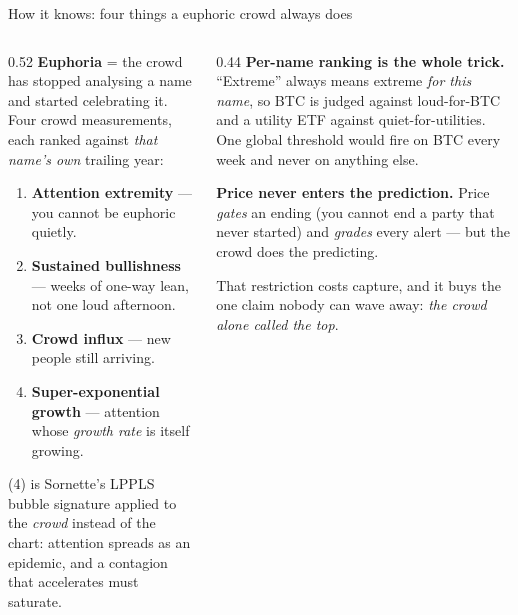\documentclass[aspectratio=169,11pt]{beamer}
\begin{document}
\begin{frame}{How it knows: four things a euphoric crowd always does}
  \begin{columns}[T]
    \begin{column}{0.52\linewidth}
      \small
      \textbf{Euphoria} = the crowd has stopped analysing a name and started
      celebrating it. Four crowd measurements, each ranked against
      \emph{that name's own} trailing year:
      \begin{enumerate}\small
        \item \textbf{Attention extremity} --- you cannot be euphoric quietly.
        \item \textbf{Sustained bullishness} --- weeks of one-way lean, not one
              loud afternoon.
        \item \textbf{Crowd influx} --- new people still arriving.
        \item \textbf{Super-exponential growth} --- attention whose
              \emph{growth rate} is itself growing.
      \end{enumerate}
      \vspace{0.3em}
      {\scriptsize (4) is Sornette's LPPLS bubble signature applied to the
       \emph{crowd} instead of the chart: attention spreads as an epidemic, and
       a contagion that accelerates must saturate.}
    \end{column}
    \begin{column}{0.44\linewidth}
      \small
      \textbf{Per-name ranking is the whole trick.} ``Extreme'' always means
      extreme \emph{for this name}, so BTC is judged against loud-for-BTC and a
      utility ETF against quiet-for-utilities. One global threshold would fire
      on BTC every week and never on anything else.
      \vspace{0.6em}

      \textbf{Price never enters the prediction.} Price \emph{gates} an ending
      (you cannot end a party that never started) and \emph{grades} every
      alert --- but the crowd does the predicting.
      \vspace{0.4em}

      {\color{gicgrey}\scriptsize That restriction costs capture, and it buys
       the one claim nobody can wave away: \emph{the crowd alone called the
       top}.}
    \end{column}
  \end{columns}
\end{frame}
\end{document}

